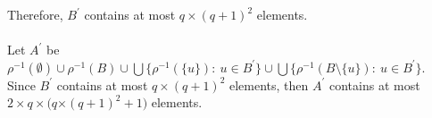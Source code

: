 \documentclass[draft]{article}
\def\id{\mathtt{id}}
\begin{document}
Therefore, $B^{\prime}$ contains at most $q{\times}(q{+}1)^{2}$ elements.
%
%
\\
\\
%
%
%
%
Let $A^{\prime}$ be $\rho^{{-}1}(\emptyset){\cup}\rho^{{-}1}(B){\cup}\bigcup\{\rho^{{-}1}(\{u\}):\ u{\in}B^{\prime}\}{\cup}\bigcup\{\rho^{{-}1}(B{\setminus}\{u\}):\ u{\in}B^{\prime}\}$.
Since $B^{\prime}$ contains at most $q{\times}(q{+}1)^{2}$ elements, then $A^{\prime}$ contains at most $2{\times}q{\times}(q
%
%
%
%
%
%
%
%
%
%
%
%
$\linebreak$
%
%
%
%
%
%
%
%
%
%
%
%
{\times}(q{+}1)^{2}+1)$ elements.
%
%
%
%
\end{document}
